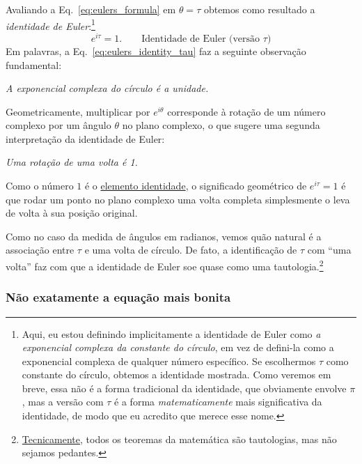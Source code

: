 Avaliando a Eq.~\eqref{eq:eulers_formula} em $\theta = \tau$ obtemos como resultado a \emph{identidade de Euler}:\footnote{Aqui, eu estou definindo implicitamente a identidade de Euler como \emph{a exponencial complexa da constante do círculo}, em vez de defini-la como a exponencial complexa de qualquer número específico. Se escolhermos $\tau$ como constante do círculo, obtemos a identidade mostrada. Como veremos em breve, essa não é a forma tradicional da identidade, que obviamente envolve $\pi$, mas a versão com $\tau$ é a forma \emph{matematicamente} mais significativa da identidade, de modo que eu acredito que merece esse nome.}
\begin{equation}
\label{eq:eulers_identity_tau}
e^{i\tau} = 1. \qquad\mbox{Identidade de Euler (versão $\tau$)}
\end{equation}
Em palavras, a Eq.~\eqref{eq:eulers_identity_tau} faz a seguinte observação fundamental:

\begin{center}
\emph{A exponencial complexa do círculo é a unidade.}
\end{center}

Geometricamente, multiplicar por $e^{i\theta}$ corresponde à rotação de um número complexo por um ângulo $\theta$ no plano complexo, o que sugere uma segunda interpretação da identidade de Euler:

\begin{center}
\emph{Uma rotação de uma volta é 1.}
\end{center}

\noindent Como o número $1$ é o \href{https://pt.wikipedia.org/wiki/Elemento_neutro}{elemento identidade}, o significado geométrico de $e^{i\tau} = 1$ é que rodar um ponto no plano complexo uma volta completa simplesmente o leva de volta à sua posição original.

Como no caso da medida de ângulos em radianos, vemos quão natural é a associação entre $\tau$ e uma volta de círculo. De fato, a identificação de $\tau$ com ``uma volta'' faz com que a identidade de Euler soe quase como uma tautologia.\footnote{\href{https://xkcd.com/1475/}{Tecnicamente}, todos os teoremas da matemática são tautologias, mas não sejamos pedantes.}

    \subsubsection{Não exatamente a equação mais bonita} %
    \label{sec:not_the_most_beautiful_equation}

